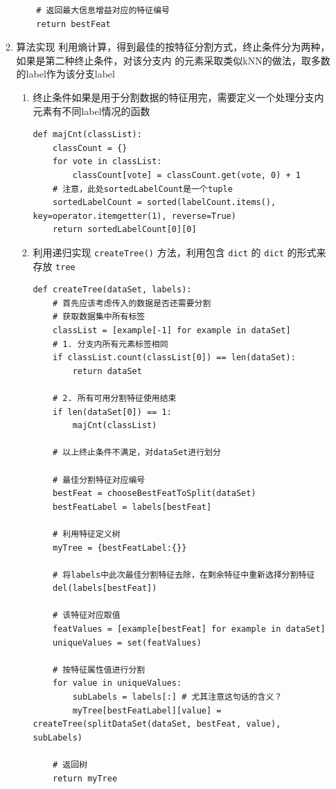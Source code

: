 \documentclass[11pt]{ctexart}
\begin{document}
\begin{enumerate}
\begin{enumerate}
\begin{lstlisting}
    # 返回最大信息增益对应的特征编号
    return bestFeat
\end{lstlisting}
\item 算法实现
利用熵计算，得到最佳的按特征分割方式，终止条件分为两种，如果是第二种终止条件，对该分支内
的元素采取类似kNN的做法，取多数的label作为该分支label
\begin{enumerate}
\item 终止条件如果是用于分割数据的特征用完，需要定义一个处理分支内元素有不同label情况的函数
\lstset{language=Python,label= ,caption= ,captionpos=b,numbers=none}
\begin{lstlisting}
def majCnt(classList):
    classCount = {}
    for vote in classList:
        classCount[vote] = classCount.get(vote, 0) + 1
    # 注意，此处sortedLabelCount是一个tuple
    sortedLabelCount = sorted(labelCount.items(), key=operator.itemgetter(1), reverse=True)
    return sortedLabelCount[0][0]
\end{lstlisting}
\item 利用递归实现 \texttt{createTree()} 方法，利用包含 \texttt{dict} 的 \texttt{dict} 的形式来存放 \texttt{tree}
\lstset{language=Python,label= ,caption= ,captionpos=b,numbers=none}
\begin{lstlisting}
def createTree(dataSet, labels):
    # 首先应该考虑传入的数据是否还需要分割
    # 获取数据集中所有标签
    classList = [example[-1] for example in dataSet]
    # 1. 分支内所有元素标签相同
    if classList.count(classList[0]) == len(dataSet):
        return dataSet

    # 2. 所有可用分割特征使用结束
    if len(dataSet[0]) == 1:
        majCnt(classList)

    # 以上终止条件不满足，对dataSet进行划分

    # 最佳分割特征对应编号
    bestFeat = chooseBestFeatToSplit(dataSet)
    bestFeatLabel = labels[bestFeat]

    # 利用特征定义树
    myTree = {bestFeatLabel:{}}

    # 将labels中此次最佳分割特征去除，在剩余特征中重新选择分割特征
    del(labels[bestFeat])

    # 该特征对应取值
    featValues = [example[bestFeat] for example in dataSet]
    uniqueValues = set(featValues)

    # 按特征属性值进行分割
    for value in uniqueValues:
        subLabels = labels[:] # 尤其注意这句话的含义？
        myTree[bestFeatLabel][value] = createTree(splitDataSet(dataSet, bestFeat, value), subLabels)

    # 返回树
    return myTree
\end{lstlisting}
\end{enumerate}
\end{enumerate}
\end{enumerate}
\end{document}
